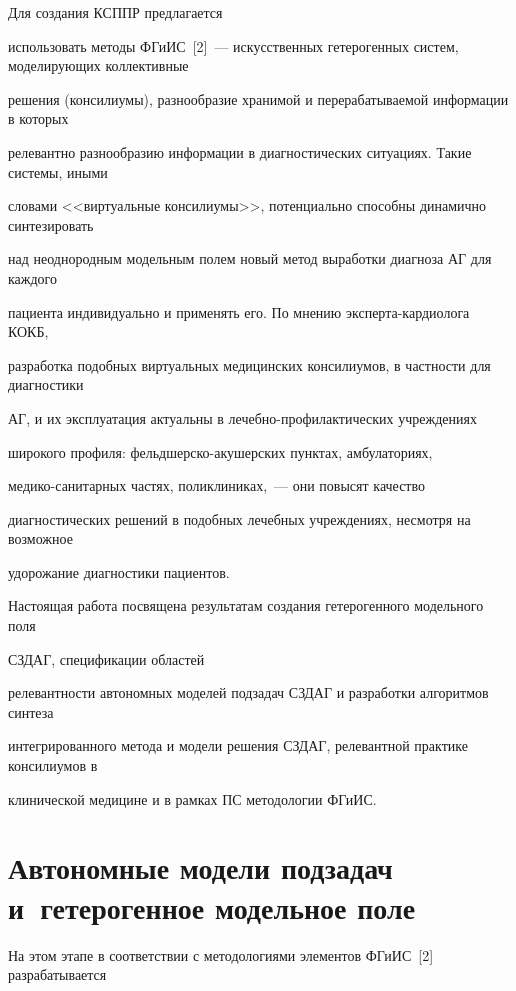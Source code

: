  Для создания КСППР предлагается


использовать методы ФГиИС~[2]~--- искусственных гетерогенных систем, моделирующих коллективные


решения (консилиумы), разнообразие хранимой и перерабатываемой информации в которых


релевантно разнообразию информации в диагностических ситуациях. Такие системы, иными


словами <<виртуальные консилиумы>>, потенциально способны динамично синтезировать


над неоднородным модельным полем новый метод выработки диагноза АГ для каждого


пациента индивидуально и применять его. По мнению экс\-пер\-та-кар\-дио\-ло\-га КОКБ,


разработка подобных виртуальных медицинских консилиумов, в частности для диагностики


АГ, и их эксплуатация актуальны в ле\-чеб\-но-про\-фи\-лак\-ти\-че\-ских учреждениях


широкого профиля: фельд\-шерско-аку\-шер\-ских пунктах, амбулаториях,


 ме\-ди\-ко-са\-ни\-тар\-ных частях, поликлиниках,~--- они повысят качество


диагностических решений в подобных лечебных учреждениях, несмотря на возможное


удорожание диагностики пациентов.





 Настоящая работа посвящена результатам создания гетерогенного модельного поля


СЗДАГ, спецификации областей


релевантности автономных моделей подзадач СЗДАГ и разработки алгоритмов синтеза


интегрированного метода и модели решения СЗДАГ, релевантной практике консилиумов в


клинической медицине и в рамках ПС методологии ФГиИС.





\section{Автономные модели подзадач и~гетерогенное модельное поле}





 На этом этапе в соответствии с методологиями элементов ФГиИС~[2] разрабатывается


